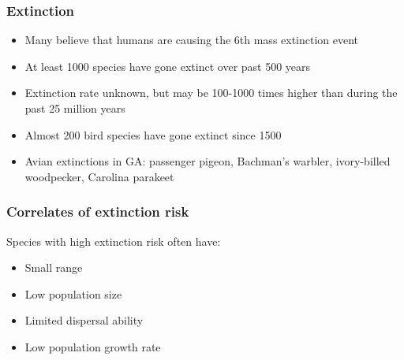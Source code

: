 \documentclass[color=usenames,dvipsnames]{beamer}\usepackage[]{graphicx}\usepackage[]{color}
\begin{document}
\begin{frame}
  \frametitle{Extinction}
  \large
  \begin{itemize}[<+->]
    \item Many believe that humans are causing the 6th mass extinction event
    \item At least 1000 species have gone extinct over past 500 years
    \item Extinction rate unknown, but may be 100-1000 times higher
      than during the past 25 million years
    \item Almost 200 bird species have gone extinct since 1500
    \item Avian extinctions in GA: passenger
      pigeon, Bachman's warbler, ivory-billed woodpecker, Carolina parakeet
  \end{itemize}
\end{frame}



\begin{frame}
  \frametitle{Correlates of extinction risk}
  \Large
  {Species with high extinction risk often have:}
  \begin{itemize}
    \item<2-> Small range
    \item<2-> Low population size
    \item<2-> Limited dispersal ability
    \item<2-> Low population growth rate
  \end{itemize}
\end{frame}
\end{document}
